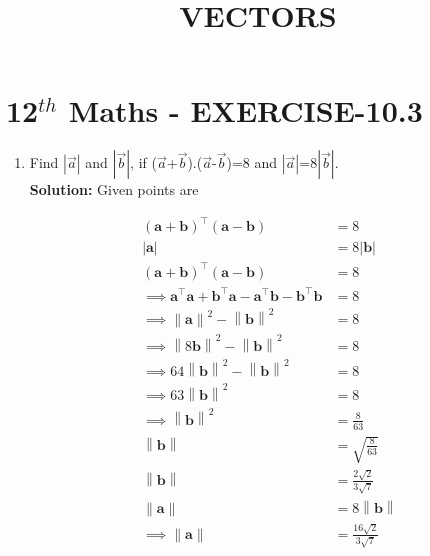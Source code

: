 \documentclass[10pt]{article}
\newcommand{\solution}{\noindent \textbf{Solution: }}
\providecommand{\norm}[1]{\left\lVert#1\right\rVert}
\providecommand{\abs}[1]{\left\vert#1\right\vert}
\let\vec\mathbf{}
\begin{document}
\begin{center}
\title{\textbf{VECTORS}}
\date{\vspace{-5ex}} %
\maketitle
\end{center}

\section{12$^{th}$ Maths - EXERCISE-10.3}

\begin{enumerate}
\item Find $\abs{\overrightarrow{a}}$ and $\abs{\overrightarrow{b}}$, if ($\overrightarrow{a}$+$\overrightarrow{b}$)$.$($\overrightarrow{a}$-$\overrightarrow{b}$)=8 and $\abs{\overrightarrow{a}}$=8$\abs{\overrightarrow{b}}$.\\  

\solution
Given  points are

\begin{align}
(\vec{a}+\vec{b})^{\top}(\vec{a}-\vec{b})&=8\\
\abs{\vec{a}}&=8\abs{\vec{b}}\\
(\vec{a}+\vec{b})^{\top}(\vec{a}-\vec{b})&=8\\
\implies\vec{a}^{\top}\vec{a}+\vec{b}^{\top}\vec{a}-\vec{a}^{\top}\vec{b}-\vec{b}^{\top}\vec{b}&=8\\
\implies\norm{\vec{a}}^2-\norm{\vec{b}}^2&=8\\
\implies\norm{8\vec{b}}^2-\norm{\vec{b}}^2&=8\\
\implies64{\norm{\vec{b}}}^2-\norm{\vec{b}}^2&=8\\
\implies63{\norm{\vec{b}}}^2&=8\\
\implies\norm{\vec{b}}^2&=\frac{8}{63}\\
\norm{\vec{b}}&=\sqrt{\frac{8}{63}}\\
\norm{\vec{b}}&=\frac{2\sqrt{2}}{3\sqrt{7}}\\
\norm{\vec{a}}&=8\norm{\vec{b}}\\
\implies\norm{\vec{a}}&=\frac{16\sqrt{2}}{3\sqrt{7}}
\end{align}
\end{enumerate}
\end{document}
